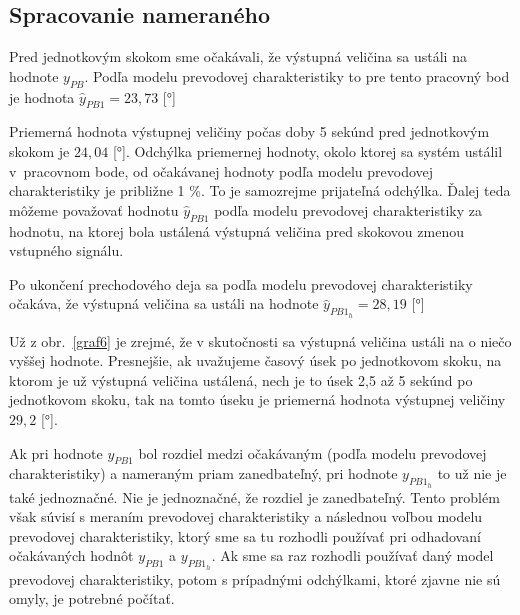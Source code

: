 \documentclass[a4paper, 10pt, ]{article}
\begin{document}
\begin{figure}[!hb]
	\centering


    \vspace{-4mm}

	\caption{}
	\label{graf8}

\end{figure}









\subsection{Spracovanie nameraného}


Pred jednotkovým skokom sme očakávali, že výstupná veličina sa ustáli na hodnote $y_{PB}$. Podľa modelu prevodovej charakteristiky to pre tento pracovný bod je hodnota $\hat y_{PB1} = 23,73$ [°]


Priemerná hodnota výstupnej veličiny počas doby 5 sekúnd pred jednotkovým skokom je $24,04$ [°]. Odchýlka priemernej hodnoty, okolo ktorej sa systém ustálil v~pracovnom bode, od očakávanej hodnoty podľa modelu prevodovej charakteristiky je približne 1 \%. To je samozrejme prijateľná odchýlka. Ďalej teda môžeme považovať hodnotu $\hat y_{PB1}$ podľa modelu prevodovej charakteristiky za hodnotu, na ktorej bola ustálená výstupná veličina pred skokovou zmenou vstupného signálu.

Po ukončení prechodového deja sa podľa modelu prevodovej charakteristiky očakáva, že výstupná veličina sa ustáli na hodnote $\hat y_{PB1_h} = 28,19$ [°]

Už z obr.~\ref{graf6} je zrejmé, že v skutočnosti sa výstupná veličina ustáli na o niečo vyššej hodnote. Presnejšie, ak uvažujeme časový úsek po jednotkovom skoku, na ktorom je už výstupná veličina ustálená, nech je to úsek 2,5 až 5 sekúnd po jednotkovom skoku, tak na tomto úseku je priemerná hodnota výstupnej veličiny $29,2$ [°].



Ak pri hodnote $y_{PB1}$ bol rozdiel medzi očakávaným (podľa modelu prevodovej charakteristiky) a nameraným priam zanedbateľný, pri hodnote $y_{PB1_h}$ to už nie je také jednoznačné. Nie je jednoznačné, že rozdiel je zanedbateľný. Tento problém však súvisí s meraním prevodovej charakteristiky a následnou voľbou modelu prevodovej charakteristiky, ktorý sme sa tu rozhodli používať pri odhadovaní očakávaných hodnôt $y_{PB1}$ a $y_{PB1_h}$. Ak sme sa raz rozhodli používať daný model prevodovej charakteristiky, potom s prípadnými odchýlkami, ktoré zjavne nie sú omyly, je potrebné počítať.
\end{document}
